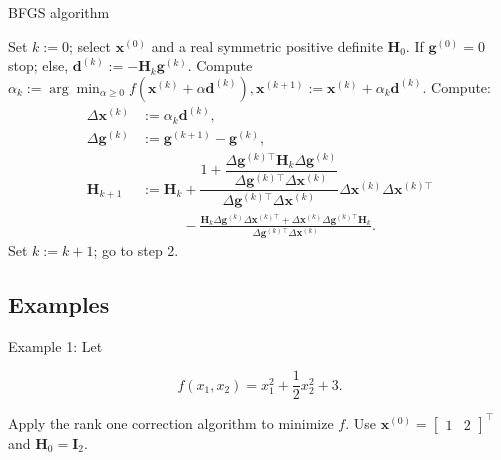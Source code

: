 \begin{algorithm}
\caption{BFGS algorithm}  \label{alg:BFGS}
\begin{spacing}{1.5}
	\begin{algorithmic}[1]
		\State Set \( k := 0 \); select \( \boldsymbol{x}^{(0)} \) and a real symmetric positive definite \( \boldsymbol{H}_0 \).
		\State If {\( \boldsymbol{g}^{(0)} = 0 \)} stop; else, \( \boldsymbol{d}^{(k)} := -\boldsymbol{H}_k \boldsymbol{g}^{(k)} \).
		\State Compute \( \alpha_k := \arg \min_{\alpha \geq 0} f(\boldsymbol{x}^{(k)} + \alpha \boldsymbol{d}^{(k)}), \boldsymbol{x}^{(k+1)} := \boldsymbol{x}^{(k)} + \alpha_k \boldsymbol{d}^{(k)} \).
		\State Compute:
		\begin{align*}
			\Delta \boldsymbol{x}^{(k)} &:= \alpha_k \boldsymbol{d}^{(k)}, \\
			\Delta \boldsymbol{g}^{(k)} &:= \boldsymbol{g}^{(k+1)} - \boldsymbol{g}^{(k)}, \\
			\boldsymbol{H}_{k+1} &:= \boldsymbol{H}_k + \dfrac{1 + \dfrac{\Delta \boldsymbol{g}^{(k)\top} \boldsymbol{H}_k \Delta \boldsymbol{g}^{(k)}}{\Delta \boldsymbol{g}^{(k)\top} \Delta \boldsymbol{x}^{(k)}}}{\Delta \boldsymbol{g}^{(k)\top} \Delta \boldsymbol{x}^{(k)}} \Delta \boldsymbol{x}^{(k)} \Delta \boldsymbol{x}^{(k)\top} \\
			&\phantom{:= \boldsymbol{H}_k } - \frac{\boldsymbol{H}_k \Delta \boldsymbol{g}^{(k)} \Delta \boldsymbol{x}^{(k)\top} + \Delta \boldsymbol{x}^{(k)} \Delta \boldsymbol{g}^{(k)\top} \boldsymbol{H}_k}{\Delta \boldsymbol{g}^{(k)\top} \Delta \boldsymbol{x}^{(k)}}.
		\end{align*}
		\State Set \( k := k + 1 \); go to step 2.
	\end{algorithmic}
\end{spacing}
\end{algorithm}


\newpage
\subsection{Examples}
Example 1: Let

\[
	f\left(x_{1}, x_{2}\right)=x_{1}^{2}+\frac{1}{2} x_{2}^{2}+3 .
\]

Apply the rank one correction algorithm to minimize \(f\). Use \(\boldsymbol{x}^{(0)}=\left[\begin{array}{ll}1 & 2\end{array}\right]^{\top}\) and \(\boldsymbol{H}_{0}=\boldsymbol{I}_{2}\).

